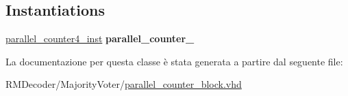 \subsection*{Instantiations}
 \begin{DoxyCompactItemize}
\item 
\hypertarget{classparallel__counter__block_1_1_structural_a21cd54fb4e5b6e09887a04d47ed85639}{\hyperlink{classparallel__counter__block_1_1_structural_a21cd54fb4e5b6e09887a04d47ed85639}{parallel\+\_\+counter4\+\_\+inst}  {\bfseries parallel\+\_\+counter\+\_}   }\label{classparallel__counter__block_1_1_structural_a21cd54fb4e5b6e09887a04d47ed85639}

\end{DoxyCompactItemize}


La documentazione per questa classe è stata generata a partire dal seguente file\+:\begin{DoxyCompactItemize}
\item 
R\+M\+Decoder/\+Majority\+Voter/\hyperlink{parallel__counter__block_8vhd}{parallel\+\_\+counter\+\_\+block.\+vhd}\end{DoxyCompactItemize}

